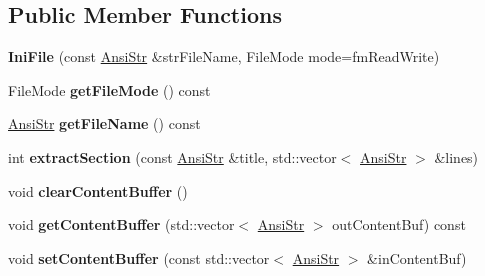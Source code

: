 \subsection*{Public Member Functions}
\begin{DoxyCompactItemize}
\item 
\hypertarget{classps_1_1utils_1_1IniFile_a33ce9f03f3f70c25e5d38ced09f481d2}{}{\bfseries Ini\+File} (const \hyperlink{classps_1_1base_1_1CAString}{Ansi\+Str} \&str\+File\+Name, File\+Mode mode=fm\+Read\+Write)\label{classps_1_1utils_1_1IniFile_a33ce9f03f3f70c25e5d38ced09f481d2}

\item 
\hypertarget{classps_1_1utils_1_1IniFile_aabe8563b7528ec69b2c09e853d888a3a}{}File\+Mode {\bfseries get\+File\+Mode} () const \label{classps_1_1utils_1_1IniFile_aabe8563b7528ec69b2c09e853d888a3a}

\item 
\hypertarget{classps_1_1utils_1_1IniFile_a8dc30778ae042ee0f6059d4e897c9598}{}\hyperlink{classps_1_1base_1_1CAString}{Ansi\+Str} {\bfseries get\+File\+Name} () const \label{classps_1_1utils_1_1IniFile_a8dc30778ae042ee0f6059d4e897c9598}

\item 
\hypertarget{classps_1_1utils_1_1IniFile_aa7cc97c94e5e961fe429fdc458edcdb5}{}int {\bfseries extract\+Section} (const \hyperlink{classps_1_1base_1_1CAString}{Ansi\+Str} \&title, std\+::vector$<$ \hyperlink{classps_1_1base_1_1CAString}{Ansi\+Str} $>$ \&lines)\label{classps_1_1utils_1_1IniFile_aa7cc97c94e5e961fe429fdc458edcdb5}

\item 
\hypertarget{classps_1_1utils_1_1IniFile_af3b90889481cbbc3499b959cd7eca0b5}{}void {\bfseries clear\+Content\+Buffer} ()\label{classps_1_1utils_1_1IniFile_af3b90889481cbbc3499b959cd7eca0b5}

\item 
\hypertarget{classps_1_1utils_1_1IniFile_a6ecd023595e6c6e44a46804aa557d4a0}{}void {\bfseries get\+Content\+Buffer} (std\+::vector$<$ \hyperlink{classps_1_1base_1_1CAString}{Ansi\+Str} $>$ out\+Content\+Buf) const \label{classps_1_1utils_1_1IniFile_a6ecd023595e6c6e44a46804aa557d4a0}

\item 
\hypertarget{classps_1_1utils_1_1IniFile_a62a5f4a75b1c45a0e5cd166fd43af646}{}void {\bfseries set\+Content\+Buffer} (const std\+::vector$<$ \hyperlink{classps_1_1base_1_1CAString}{Ansi\+Str} $>$ \&in\+Content\+Buf)\label{classps_1_1utils_1_1IniFile_a62a5f4a75b1c45a0e5cd166fd43af646}


\end{DoxyCompactItemize}
